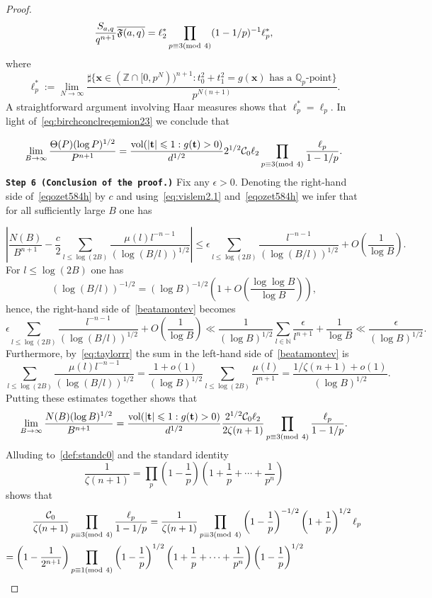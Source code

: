 \documentclass[a4paper,12pt,reqno]{amsart}
\numberwithin{equation}{section} \numberwithin{figure}{section}
\newcommand\Z{\mathbb{Z}}
\newcommand\N{\mathbb{N}}
\newcommand\Q{\mathbb{Q}}
\newcommand{\md}[1]{  \left(\textnormal{mod}\ #1\right)}
\renewcommand{\l}{\left}
\renewcommand{\r}{\right}
\renewcommand{\b}{\mathbf}
\renewcommand{\c}{\mathcal}
\renewcommand{\leq}{\leqslant}
\renewcommand{\#}{\sharp}
\theoremstyle{definition}
\numberwithin{lemma}{section}
\newcommand{\beq}[2]
{
\begin{equation}
\label{#1}
{#2}
\end{equation}
}
\begin{document}
\begin{proof}
$$\frac{S_{a,q}}{q^{n+1} }  
\overline{ \mathfrak F(a,q)}  = \ell^*_2 \prod_{p\equiv 3 \md 4} (1-1/p)^{-1} \ell^*_p,$$
where  $$\ell^*_p:=
\lim_{N\to \infty }\frac{\#\{\b x \in (\Z\cap[0,p^N))^{n+1} : t_0^2+t_1^2=g(\b  x ) \text{ has a } \Q_p\text{-point}\}}{p^{N (n+1) }} 
 .$$A straightforward argument involving Haar measures shows that  $\ell^*_p=\ell_p$.
In light of~\eqref{eq:birchconclreqemion23}
we conclude that 
\beq{eqozet584h}{
\lim_{B\to \infty}
\frac{ \Theta(P)(\log P)^{1/2}}{ P^{n+1}}= 
\frac{ \textrm{vol}(|\b t|\leq 1  :g(\b t )> 0)}{d^{1/2}}
2^{1/2} \c C_0  \ell_2 \prod_{p\equiv 3 \md 4}\frac{  \ell_p}{1-1/p}
.} \textbf{\texttt{Step 6 (Conclusion of the proof.)}} Fix any $\epsilon>0$. Denoting the right-hand side of~\eqref{eqozet584h} by $c$
and using~\eqref{eq:vislem2.1} and~\eqref{eqozet584h} 
we infer that for all sufficiently large $B$ one has 
\beq{beatamontev}{
\l|\frac{N(B)}{B^{n+1} }-\frac{c}{2} \sum_{l\leq \log(2B)  } \frac{\mu(l)  l^{-n-1}}{ (\log( B/l ))^{1/2}}\r|\leq \epsilon \sum_{l \leq \log(2B) } 
\frac{ l^{-n-1} }{(\log (B/l))^{1/2}} +O\l(\frac{1}{\log B}\r)
.} For $l \leq \log(2B)$ one has \beq{eq:taylorrr}{(\log (B/l))^{-1/2} = (\log B)^{-1/2}\l (1+O\l(\frac{\log \log B}{\log B}\r)\r),}hence, 
the right-hand side of~\eqref{beatamontev} becomes 
$$ \epsilon \sum_{l \leq \log(2B) } 
\frac{ l^{-n-1} }{(\log (B/l))^{1/2}} +O\l(\frac{1 }{\log B}\r)
\ll 
\frac{1 }{(\log B)^{1/2}} 
  \sum_{l \in \N } 
\frac{\epsilon}{l^{n+1} } + \frac{1 }{\log B} \ll \frac{\epsilon  }{(\log B)^{1/2}} . $$
Furthermore, by~\eqref{eq:taylorrr} the sum in the left-hand side of~\eqref{beatamontev}
is  
$$  \sum_{l\leq \log(2B)  } \frac{\mu(l)  l^{-n-1}}{ (\log( B/l ))^{1/2}}=
\frac{1+o(1) }{(\log B)^{1/2}}
 \sum_{l\leq \log(2B)  } \frac{\mu(l) }{ l^{n+1}}
=\frac{1/\zeta(n+1) +o(1)}{(\log B)^{1/2} }. $$ Putting these estimates together shows that 
$$
\lim_{B\to\infty}\frac{N(B)(\log B)^{1/2}}{B^{n+1} } =
 \frac{ \textrm{vol}(|\b t|\leq 1  :g(\b t )> 0)}{d^{1/2}}
\frac{2^{1/2} \c C_0  \ell_2}{2\zeta(n+1) } 
 \prod_{p\equiv 3 \md 4}\frac{  \ell_p}{1-1/p}
.$$
Alluding to~\eqref{def:standc0} and 
  the standard identity 
 $$\frac{1}{\zeta(n+1) }
= \prod_p \l(1-\frac{1}{p} \r) \l(1+\frac{1}{p}+\cdots+\frac{1}{p^n} \r) 
$$ shows  that  
  \begin{align*}
\frac{ \c C_0   }{ \zeta(n+1) } 
& \prod_{p\equiv 3 \md 4}\frac{  \ell_p}{1-1/p}
=\frac{ 1  }{ \zeta(n+1) } 
 \prod_{p\equiv 3 \md 4} \l(1-\frac{1}{p}\r)^{-1/2}  \l(1+\frac{1}{p}\r)^{1/2}  \ell_p 
\\=
\l(1-\frac{1}{2^{n+1} }\r)
&\prod_{p\equiv 1 \md 4}  \l(1-\frac{1}{p}\r)^{1/2} \l(1+\frac{1}{p}+\cdots+\frac{1}{p^n} \r) \l(1-\frac{1}{p} \r)^{1/2}

\end{align*}
\end{proof}
\end{document}
